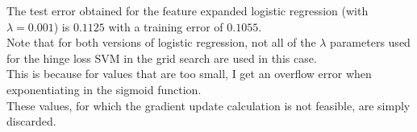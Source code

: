The test error obtained for the feature expanded logistic regression (with $\lambda = 0.001$) is $0.1125$ with a training error of $0.1055$.\\
Note that for both versions of logistic regression, not all of the $\lambda$ parameters used for the hinge loss SVM in the grid search are used in this case.\\ 
This is because for values that are too small, I get an overflow error when exponentiating in the sigmoid function.\\ 
These values, for which the gradient update calculation is not feasible, are simply discarded.\\
